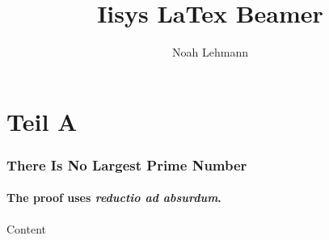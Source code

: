 \documentclass[12pt]{beamer}
\title{Iisys LaTex Beamer}
\author{Noah Lehmann}
\institute{FG Intelligente \& Lernende Systeme}
\begin{document}
    \begin{frame}
        \titlepage
    \end{frame}


    \section{Teil A}
    \begin{frame}
        \frametitle{There Is No Largest Prime Number}
        \framesubtitle{The proof uses \textit{reductio ad absurdum}.}
        \begin{adjustwidth}{1cm}{1cm}
            Content
        \end{adjustwidth}
    \end{frame}
\end{document}

